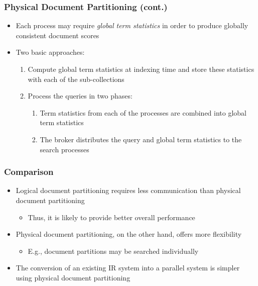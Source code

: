 \documentclass{beamer}
\begin{document}
\begin{frame}
    \frametitle{Physical Document Partitioning (cont.)}
    
    \begin{itemize}
    \item Each process may require \emph{global term statistics} in order to
        produce globally consistent document scores
    \item Two basic approaches:
        \begin{enumerate}
        \item Compute global term statistics at indexing time and store these
            statistics with each of the sub-collections
        \item Process the queries in two phases:
            \begin{enumerate}
            \item Term statistics from each of the processes are combined into
                global term statistics
            \item The broker distributes the query and global term statistics
                to the search processes
            \end{enumerate}
        \end{enumerate}
    \end{itemize}
\end{frame}

\begin{frame}
    \frametitle{Comparison}
    \begin{itemize}
    \item Logical document partitioning requires less communication than
        physical document partitioning
        \begin{itemize}
        \item Thus, it is likely to provide better overall performance
        \end{itemize}
    \item Physical document partitioning, on the other hand, offers more
        flexibility
        \begin{itemize}
        \item E.g., document partitions may be searched individually
        \end{itemize}
    \item The conversion of an existing IR system into a parallel system is
        simpler using physical document partitioning
    \end{itemize}
\end{frame}
\end{document}
